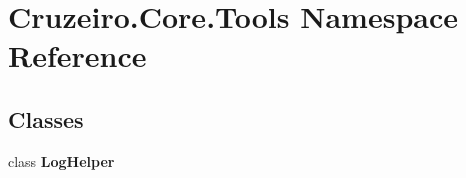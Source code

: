 \hypertarget{namespace_cruzeiro_1_1_core_1_1_tools}{}\section{Cruzeiro.\+Core.\+Tools Namespace Reference}
\label{namespace_cruzeiro_1_1_core_1_1_tools}
\subsection*{Classes}
\begin{DoxyCompactItemize}
\item 
class {\bfseries Log\+Helper}
\end{DoxyCompactItemize}
